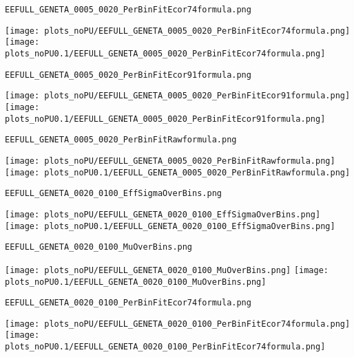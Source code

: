\begin{frame}[fragile]
\begin{verbatim}
EEFULL_GENETA_0005_0020_PerBinFitEcor74formula.png
\end{verbatim}
\texttt{[image: plots\_noPU/EEFULL\_GENETA\_0005\_0020\_PerBinFitEcor74formula.png]}
\texttt{[image: plots\_noPU0.1/EEFULL\_GENETA\_0005\_0020\_PerBinFitEcor74formula.png]}
\end{frame}
\begin{frame}[fragile]
\begin{verbatim}
EEFULL_GENETA_0005_0020_PerBinFitEcor91formula.png
\end{verbatim}
\texttt{[image: plots\_noPU/EEFULL\_GENETA\_0005\_0020\_PerBinFitEcor91formula.png]}
\texttt{[image: plots\_noPU0.1/EEFULL\_GENETA\_0005\_0020\_PerBinFitEcor91formula.png]}
\end{frame}
\begin{frame}[fragile]
\begin{verbatim}
EEFULL_GENETA_0005_0020_PerBinFitRawformula.png
\end{verbatim}
\texttt{[image: plots\_noPU/EEFULL\_GENETA\_0005\_0020\_PerBinFitRawformula.png]}
\texttt{[image: plots\_noPU0.1/EEFULL\_GENETA\_0005\_0020\_PerBinFitRawformula.png]}
\end{frame}
\begin{frame}[fragile]
\begin{verbatim}
EEFULL_GENETA_0020_0100_EffSigmaOverBins.png
\end{verbatim}
\texttt{[image: plots\_noPU/EEFULL\_GENETA\_0020\_0100\_EffSigmaOverBins.png]}
\texttt{[image: plots\_noPU0.1/EEFULL\_GENETA\_0020\_0100\_EffSigmaOverBins.png]}
\end{frame}
\begin{frame}[fragile]
\begin{verbatim}
EEFULL_GENETA_0020_0100_MuOverBins.png
\end{verbatim}
\texttt{[image: plots\_noPU/EEFULL\_GENETA\_0020\_0100\_MuOverBins.png]}
\texttt{[image: plots\_noPU0.1/EEFULL\_GENETA\_0020\_0100\_MuOverBins.png]}
\end{frame}
\begin{frame}[fragile]
\begin{verbatim}
EEFULL_GENETA_0020_0100_PerBinFitEcor74formula.png
\end{verbatim}
\texttt{[image: plots\_noPU/EEFULL\_GENETA\_0020\_0100\_PerBinFitEcor74formula.png]}
\texttt{[image: plots\_noPU0.1/EEFULL\_GENETA\_0020\_0100\_PerBinFitEcor74formula.png]}
\end{frame}
